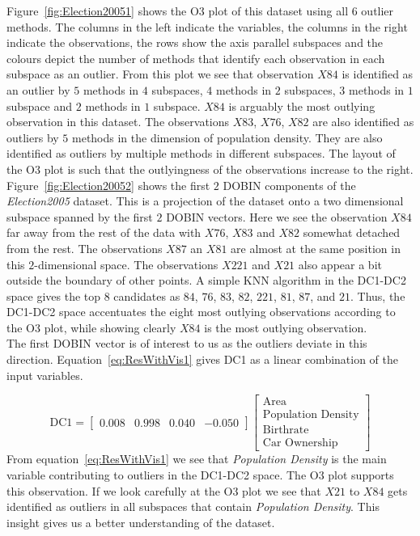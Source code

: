 \documentclass[11pt]{article}
\begin{document}
Figure~\ref{fig:Election20051} shows the O3 plot of this dataset using all $6$ outlier methods. The columns in the left indicate the variables, the columns in the right indicate the observations, the rows show the axis parallel subspaces and the colours depict the number of methods that identify each observation in each subspace as an outlier. From this plot we see that observation $X84$ is identified as an outlier by $5$ methods in $4$ subspaces, $4$ methods in $2$ subspaces, $3$ methods in $1$ subspace and $2$ methods in $1$ subspace. $X84$ is arguably the most outlying observation in this dataset. The observations $X83$, $X76$, $X82$ are also identified as outliers by $5$ methods in the dimension of population density. They are also identified as outliers by multiple methods in different subspaces. The layout of the O3 plot is such that the outlyingness of the observations increase to the right. \\

Figure~\ref{fig:Election20052} shows the first $2$ DOBIN components of the \textit{Election2005} dataset. This is a projection of the dataset onto a two dimensional subspace spanned by the first $2$ DOBIN vectors. Here we see the observation $X84$ far away from the rest of the data with $X76$, $X83$ and $X82$ somewhat detached from the rest. The observations $X87$ an $X81$ are almost at the same position in this $2$-dimensional space. The observations $X221$ and $X21$ also appear a bit outside the boundary of  other points. A simple KNN algorithm in the DC1-DC2 space gives the top $8$ candidates as $84$, $76$,  $83$, $82$, $221$, $81$, $87$, and  $21$. Thus, the DC1-DC2 space accentuates the eight most outlying observations according to the O3 plot, while showing clearly $X84$ is the most outlying observation. \\

The first DOBIN vector is of interest to us as the outliers deviate in this direction. Equation~\eqref{eq:ResWithVis1} gives DC1 as a linear combination of the input variables. 

\begin{equation}\label{eq:ResWithVis1}
    \text{DC1} = \begin{bmatrix}
    0.008 & 0.998 & 0.040 & -0.050  
    \end{bmatrix}
    \begin{bmatrix}
    \text{Area} \\
    \text{Population Density} \\
    \text{Birthrate} \\
    \text{Car Ownership}
    \end{bmatrix}
\end{equation}
From equation~\eqref{eq:ResWithVis1} we see that \textit{Population Density} is the main variable contributing to outliers in the DC1-DC2 space. The O3 plot supports this observation. If we look carefully at the O3 plot we see that $X21$ to $X84$ gets identified as outliers in  all subspaces that contain \textit{Population Density}.  This insight gives us a better understanding of the dataset. 
\end{document}
